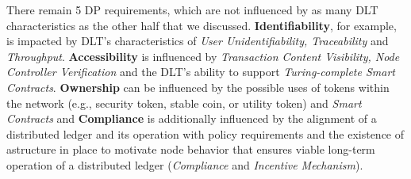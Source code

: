 There remain 5 DP requirements, which are not influenced by as many DLT characteristics as the other half that we discussed. \textbf{Identifiability}, for example, is impacted by DLT's characteristics of \textit{User Unidentifiability, Traceability} and \textit{Throughput}. \textbf{Accessibility} is influenced by \textit{Transaction Content Visibility, Node Controller Verification} and the DLT's ability to support \textit{Turing-complete Smart Contracts}. \textbf{Ownership} can be influenced by the possible uses of tokens within the network (e.g., security token, stable coin, or utility token) and \textit{Smart Contracts} and \textbf{Compliance} is additionally influenced by the alignment of a distributed ledger and its operation with policy requirements and the existence of astructure in place to motivate node behavior that ensures viable long-term operation of a distributed ledger (\textit{Compliance} and \textit{Incentive Mechanism}). \newline

\begin{comment}

\begin{center}
\begin{tabular}{m{3cm} m{4.5cm} }
Requirement & Numer of Characteristics \\ \hline
Trust & \hspace{110pt}19 \\ 
Security & \hspace{110pt}11 \\ 
Scalability & \hspace{115pt}8 \\
Traceability & \hspace{115pt}6 \\
Usability & \hspace{115pt}5 \\
Interoperability & \hspace{115pt}3 \\
Identifiability & \hspace{115pt}3 \\
Accessibility & \hspace{115pt}3 \\
Compliance & \hspace{115pt}3 \\
Ownership & \hspace{115pt}2 \\
\end{tabular}
\end{center}


\end{comment}

